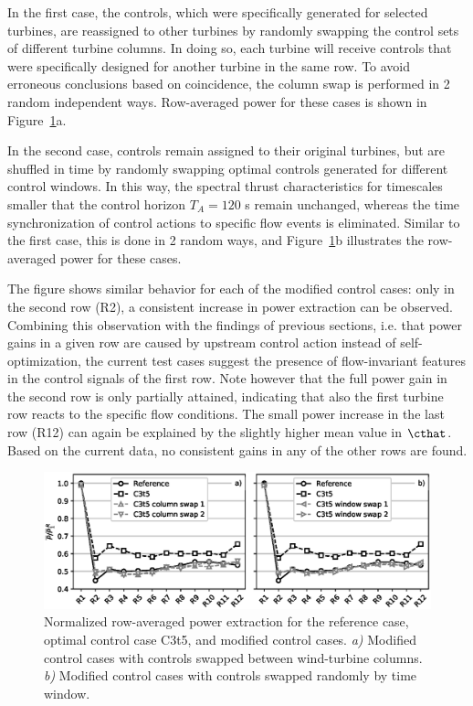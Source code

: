 	In the first case, the controls, which were specifically generated for selected turbines, are reassigned to other turbines by randomly swapping the control sets of different turbine columns. In doing so, each turbine will receive controls that were specifically designed for another turbine in the same row. To avoid erroneous conclusions based on coincidence, the column swap is performed in 2 random independent ways. Row-averaged power for these cases is shown in Figure~\ref{fig:scrambled}a. 
	
	In the second case, controls remain assigned to their original turbines, but are shuffled in time by randomly swapping optimal controls generated for different control windows. In this way, the spectral thrust characteristics for timescales smaller that the control horizon $T_A = 120$ s remain unchanged, whereas the time synchronization of control actions to specific flow events is eliminated. Similar to the first case, this is done in 2 random ways, and Figure~\ref{fig:scrambled}b illustrates the row-averaged power for these cases.

	The figure shows similar behavior for each of the modified control cases: only in the second row (R2), a consistent increase in power extraction can be observed. Combining this observation with the findings of previous sections, i.e. that power gains in a given row are caused by upstream control action instead of self-optimization, the current test cases suggest the presence of flow-invariant	features in the control signals of the first row. Note however that the full power gain in the second row is only partially attained, indicating that also the first turbine row reacts to the specific flow conditions. The small power increase in the last row (R12) can again be explained by the slightly higher mean value in $\cthat$. Based on the current data, no consistent gains in any of the other rows are found. 

	\begin{figure}
		\includegraphics[width=\textwidth]{chapters/analysis_induction_control/scrambled.eps}
		\caption{Normalized row-averaged power extraction for the reference case, optimal control case C3t5, and modified control cases. \emph{a)} Modified control cases with controls swapped between wind-turbine columns. \emph{b)} Modified control cases with controls swapped randomly by time window. \label{fig:scrambled}}
	\end{figure}

